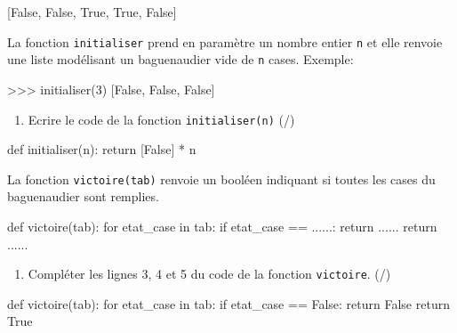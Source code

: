     \begin{CodePythontexAlt}[TaillePolice=\large, Largeur=1\linewidth,Centre,Lignes=true,PremLigne=1]{}
[False, False, True, True, False]
\end{CodePythontexAlt}

 La fonction \texttt{initialiser} prend en paramètre un nombre entier \texttt{n} et elle renvoie une liste modélisant un baguenaudier vide de \texttt{n} cases. Exemple:

    \begin{CodePythontexAlt}[TaillePolice=\large, Largeur=1\linewidth,Centre,Lignes=true,PremLigne=1]{}
    >>> initialiser(3)
    [False, False, False]
\end{CodePythontexAlt}

\pagebreak

\begin{enumerate}[resume=monDS]
\item Ecrire le code de la fonction \texttt{initialiser(n)} (/)
\end{enumerate}

\begin{blocvisible}[height=3]
    \begin{CodePythontexAlt}[TaillePolice=\large, Largeur=1\linewidth,Centre,Lignes=true,PremLigne=1]{}
    def initialiser(n):
        return [False] * n
    \end{CodePythontexAlt}
\end{blocvisible}

\medskip

 La fonction \texttt{victoire(tab)} renvoie un booléen indiquant si toutes les cases du baguenaudier sont remplies.

    \begin{CodePythontexAlt}[TaillePolice=\large, Largeur=1\linewidth,Centre,Lignes=true,PremLigne=1]{}
def victoire(tab):
    for etat_case in tab:
        if etat_case == ......:
            return ......
    return ......

    \end{CodePythontexAlt}


        \begin{enumerate}[resume=monDS]
\item Compléter les lignes 3, 4 et 5 du code de la fonction \texttt{victoire}.  (/)
\end{enumerate}

\begin{blocvisible}[height=4]
    \begin{CodePythontexAlt}[TaillePolice=\large, Largeur=1\linewidth,Centre,Lignes=true,PremLigne=1]{}
    def victoire(tab):
        for etat_case in tab:
            if etat_case == False:
                return False
        return True
    \end{CodePythontexAlt}
\end{blocvisible}

